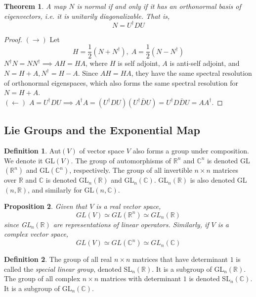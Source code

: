 \documentclass{article}
\newtheorem{theorem}{Theorem}[section]
\newtheorem{proposition}[theorem]{Proposition}
\theoremstyle{remark}
\theoremstyle{definition}
\newtheorem{definition}{Definition}[section]
\begin{document}
\begin{theorem}
A map $N$ is normal if and only if it has an orthonormal basis of eigenvectors, i.e. it is unitarily diagonalizable. That is, 
\[N = U^\dagger D U \]
\end{theorem}

\begin{proof}
$(\rightarrow)$ Let 
\[H = \frac{1}{2} (N + N^\dagger), \; A = \frac{1}{2} (N - N^\dagger)\]
$N^\dagger N = N N^\dagger \implies A H = H A$, where $H$ is self adjoint, $A$ is anti-self adjoint, and $N = H + A, N^\dagger = H - A$. Since $A H = H A$, they have the same spectral resolution of orthonormal eigenspaces, which also forms the same spectral resolution for $N = H + A$. \\
$(\leftarrow)$ $A = U^\dagger D U \implies A^\dagger A = (U^\dagger D U) (U^\dagger \bar{D} U) = U^\dagger D \bar{D} U = A A^\dagger$. 
\end{proof}

\subsection{Lie Groups and the Exponential Map}
\begin{definition}
Aut$(V)$ of vector space $V$ also forms a group under composition. We denote it GL$(V)$. The group of automorphisms of $\mathbb{R}^n$ and $\mathbb{C}^n$ is denoted GL$(\mathbb{R}^n)$ and GL$(\mathbb{C}^n)$, respectively. The group of all invertible $n \times n$ matrices over $\mathbb{R}$ and $\mathbb{C}$ is denoted GL$_n(\mathbb{R})$ and GL$_n(\mathbb{C})$. GL$_n(\mathbb{R})$ is also denoted GL$(n, \mathbb{R})$, and similarly for GL$(n, \mathbb{C})$. 
\end{definition}

\begin{proposition}
Given that $V$ is a real vector space, 
\[GL(V) \simeq GL(\mathbb{R}^n) \simeq GL_n (\mathbb{R})\]
since GL$_n(\mathbb{R})$ are representations of linear operators. Similarly, if $V$ is a complex vector space, 
\[GL(V) \simeq GL(\mathbb{C}^n) \simeq GL_n (\mathbb{C})\]
\end{proposition}

\begin{definition}
The group of all real $n \times n$ matrices that have determinant $1$ is called the \textit{special linear group}, denoted SL$_n (\mathbb{R})$. It is a subgroup of GL$_n (\mathbb{R})$. The group of all complex $n \times n$ matrices with determinant $1$ is denoted SL$_n (\mathbb{C})$. It is a subgroup of GL$_n(\mathbb{C})$. 
\end{definition}
\end{document}

